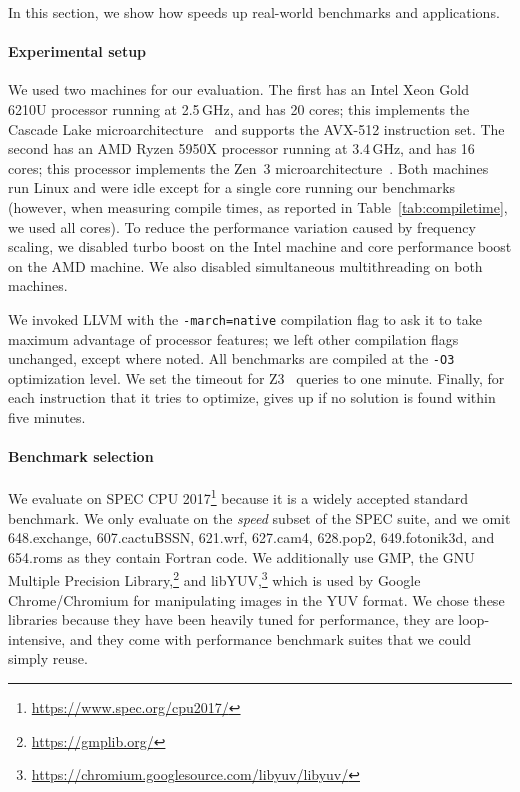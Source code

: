In this section, we show how \minotaur{} speeds up real-world benchmarks
and applications.

\paragraph{Experimental setup}
%
We used two machines for our evaluation.
%
The first has an Intel Xeon Gold 6210U processor running at 2.5\,GHz,
and has 20 cores; this implements the Cascade Lake
microarchitecture~\cite{cascadelake} and supports the AVX-512
instruction set.
%
The second has an AMD Ryzen 5950X processor running at 3.4\,GHz, and
has 16 cores; this processor implements the Zen~3
microarchitecture~\cite{zen3}.
%
Both machines run Linux and were idle except for a single core running
our benchmarks (however, when measuring compile times, as reported in
Table~\ref{tab:compiletime}, we used all cores).
%
To reduce the performance variation caused by frequency scaling, we
disabled turbo boost on the Intel machine and core performance
boost on the AMD machine.
%
We also disabled simultaneous multithreading on both machines.


We invoked LLVM with the \texttt{-march=native} compilation flag to
ask it to take maximum advantage of processor features; we left other
compilation flags unchanged, except where noted.
%
All benchmarks are compiled at the \texttt{-O3} optimization level.
%
We set the timeout for Z3~\cite{z3} queries to one minute.
%
Finally, for each instruction that it tries to optimize, \minotaur{} gives
up if no solution is found within five minutes.


\paragraph{Benchmark selection}
%
We evaluate on SPEC CPU 2017\footnote{\url{https://www.spec.org/cpu2017/}}
because it is a widely accepted standard
benchmark.
%
We only evaluate on the \emph{speed} subset of the SPEC suite, and we omit
648.exchange, 607.cactuBSSN, 621.wrf, 627.cam4, 628.pop2, 649.fotonik3d,
and 654.roms as they contain Fortran code.
%
We additionally use GMP, the GNU Multiple Precision
Library,\footnote{\url{https://gmplib.org/}} and
libYUV,\footnote{\url{https://chromium.googlesource.com/libyuv/libyuv/}}
which is used by Google Chrome/Chromium for manipulating images in the
YUV format.
%
We chose these libraries because they have been heavily tuned for
performance, they are loop-intensive, and they come with performance
benchmark suites that we could simply reuse.


